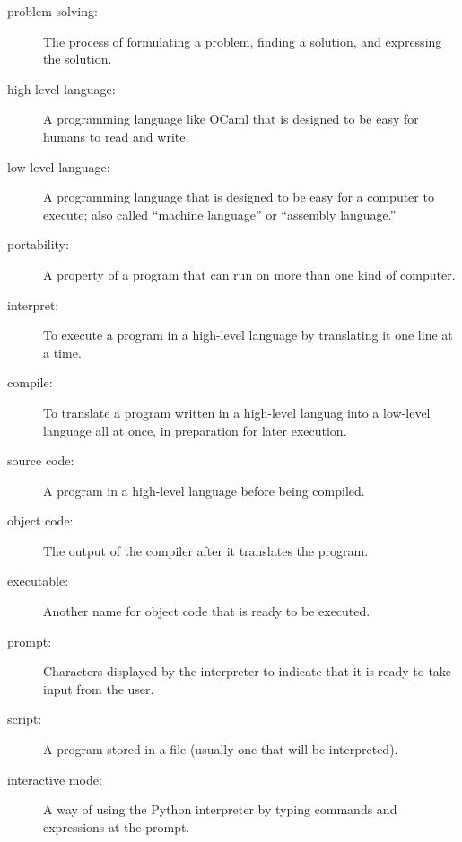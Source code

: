 \documentclass[10pt]{book}
\begin{document}
\begin{description}

\item[problem solving:]  The process of formulating a problem, finding a solution, and expressing the solution.

\item[high-level language:]  A programming language like OCaml that is designed to be easy for humans to read and write.

\item[low-level language:]  A programming language that is designed to be easy for a computer to execute; also called ``machine language'' or ``assembly language.''

\item[portability:]  A property of a program that can run on more than one kind of computer.

\item[interpret:]  To execute a program in a high-level language by translating it one line at a time.

\item[compile:]  To translate a program written in a high-level languag into a low-level language all at once, in preparation for later execution.

\item[source code:]  A program in a high-level language before being compiled.

\item[object code:]  The output of the compiler after it translates the program.

\item[executable:]  Another name for object code that is ready to be executed.

\item[prompt:] Characters displayed by the interpreter to indicate that it is ready to take input from the user.

\item[script:] A program stored in a file (usually one that will be interpreted).

\item[interactive mode:] A way of using the Python interpreter by typing commands and expressions at the prompt.


\end{description}
\end{document}
